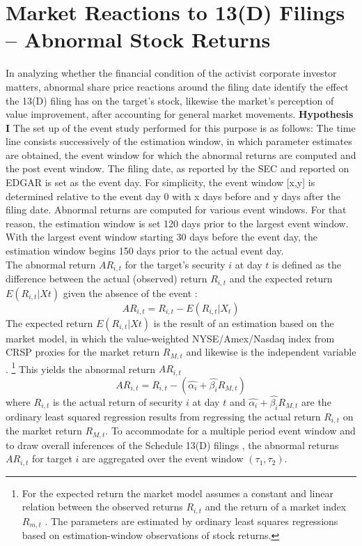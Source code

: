 \documentclass[12pt]{article}
\begin{document}
\section{Market Reactions to 13(D) Filings -- Abnormal Stock Returns}
In analyzing whether the financial condition of the activist corporate investor matters, abnormal share price reactions around the filing date identify the effect the 13(D) filing has on the target's stock, likewise the market's perception of value improvement, after accounting for general market movements.
\textbf{Hypothesis I}
The set up of the event study performed for this purpose is as follows: The time line consists successively of the estimation window, in which parameter estimates are obtained, the event window for which the abnormal returns are computed and the post event window. 
The filing date, as reported by the SEC and reported on EDGAR is set as the event day. For simplicity, the event window [x,y] is determined relative to the event day 0 with x days before and y days after the filing date. Abnormal returns are computed for various event windows. For that reason, the estimation window is set 120 days prior to the largest event window. With the largest event window starting 30 days before the event day, the estimation window begins 150 days prior to the actual event day.\\
The abnormal return $AR_{i,t}$ for the target's security $i$ at day $t$ is defined as the difference between the actual (observed) return $R_{i,t}$ and the expected return $E(R_{i,t}|X{t})$ given the absence of the event \citep[p.15]{MacKinlay1997}:
	\begin{equation}\label{eq:1}
		AR_{i,t}=R_{i,t}-E(R_{i,t}|X_{t})
	\end{equation}
The expected return $E(R_{i,t}|X{t})$ is the result of an estimation based on the market model, in which the value-weighted NYSE/Amex/Nasdaq index from CRSP proxies for the market return $R_{M,t}$ and likewise is the independent variable \citep[p.18]{MacKinlay1997}.
	\footnote{For the expected return the market model assumes a constant and linear relation between the observed returns $R_{i,t}$ and the return of a market index $R_{m,t}$ \citep[p.18]{MacKinlay1997}. The parameters are estimated by ordinary least squares regressions based on estimation-window observations of stock returns.}
This yields the abnormal return $AR_{i,t}$
	\begin{equation}\label{eq:2}
		AR_{i,t}=R_{i,t}-(\hat{\alpha_{i}}+\hat{\beta_{i}}R_{M,t})
	\end{equation}
where $R_{i,t}$ is the actual return of security $i$ at day $t$ and $\hat{\alpha_{i}}+\hat{\beta_{i}}R_{M,t}$ are the ordinary least squared regression results from regressing the actual return $R_{i,t}$ on the market return $R_{M,t}$. To accommodate for a multiple period event window and to draw overall inferences of the Schedule 13(D) filings \citep[p.21]{MacKinlay1997}, the abnormal returns $AR_{i,t}$ for target $i$ are aggregated over the event window $(\tau_1,\tau_2)$. 
\end{document}
